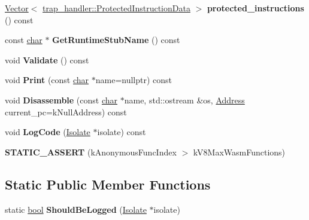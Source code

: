 \begin{DoxyCompactItemize}
\mbox{\label{classv8_1_1internal_1_1wasm_1_1WasmCode_aae6ab4b14d5c9a3ad7c31c080117180c}} 
\mbox{\hyperlink{classv8_1_1internal_1_1Vector}{Vector}}$<$ \mbox{\hyperlink{structv8_1_1internal_1_1trap__handler_1_1ProtectedInstructionData}{trap\+\_\+handler\+::\+Protected\+Instruction\+Data}} $>$ {\bfseries protected\+\_\+instructions} () const
\item 
\mbox{\label{classv8_1_1internal_1_1wasm_1_1WasmCode_abb5b483b7f4dd950b9bde4e6e0d0267f}} 
const \mbox{\hyperlink{classchar}{char}} $\ast$ {\bfseries Get\+Runtime\+Stub\+Name} () const
\item 
\mbox{\label{classv8_1_1internal_1_1wasm_1_1WasmCode_a8457a62709deef003163c655a448f756}} 
void {\bfseries Validate} () const
\item 
\mbox{\label{classv8_1_1internal_1_1wasm_1_1WasmCode_a0fd2c078c0b8a5e5d2dfa2c253c58676}} 
void {\bfseries Print} (const \mbox{\hyperlink{classchar}{char}} $\ast$name=nullptr) const
\item 
\mbox{\label{classv8_1_1internal_1_1wasm_1_1WasmCode_a67fc73055bd53a21c7fd76f8c9bb93c3}} 
void {\bfseries Disassemble} (const \mbox{\hyperlink{classchar}{char}} $\ast$name, std\+::ostream \&os, \mbox{\hyperlink{classuintptr__t}{Address}} current\+\_\+pc=k\+Null\+Address) const
\item 
\mbox{\label{classv8_1_1internal_1_1wasm_1_1WasmCode_a1b6185bcfacdf422b52d5e41f329bd5d}} 
void {\bfseries Log\+Code} (\mbox{\hyperlink{classv8_1_1internal_1_1Isolate}{Isolate}} $\ast$isolate) const
\item 
\mbox{\label{classv8_1_1internal_1_1wasm_1_1WasmCode_a712eaa664f0d91b180c527a37b78c6c8}} 
{\bfseries S\+T\+A\+T\+I\+C\+\_\+\+A\+S\+S\+E\+RT} (k\+Anonymous\+Func\+Index $>$ k\+V8\+Max\+Wasm\+Functions)
\end{DoxyCompactItemize}
\subsection*{Static Public Member Functions}
\begin{DoxyCompactItemize}
\item 
\mbox{\label{classv8_1_1internal_1_1wasm_1_1WasmCode_acb261693fa04ffc206a9289658201454}} 
static \mbox{\hyperlink{classbool}{bool}} {\bfseries Should\+Be\+Logged} (\mbox{\hyperlink{classv8_1_1internal_1_1Isolate}{Isolate}} $\ast$isolate)
\end{DoxyCompactItemize}
